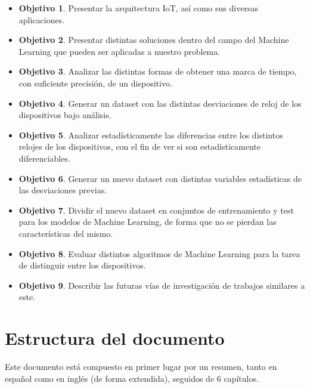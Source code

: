 \begin{itemize}
    \item \textbf{Objetivo 1}. Presentar la arquitectura IoT, así como sus diversas aplicaciones.
    \item \textbf{Objetivo 2}. Presentar distintas soluciones dentro del campo del Machine Learning que pueden ser aplicadas a nuestro problema.
    \item \textbf{Objetivo 3}. Analizar las distintas formas de obtener una marca de tiempo, con suficiente precisión, de un dispositivo.
    \item \textbf{Objetivo 4}. Generar un dataset con las distintas desviaciones de reloj de los dispositivos bajo análisis.
    \item \textbf{Objetivo 5}. Analizar estadísticamente las diferencias entre los distintos relojes de los dispositivos, con el fin de ver si son estadísticamente diferenciables.
    \item \textbf{Objetivo 6}. Generar un nuevo dataset con distintas variables estadísticas de las desviaciones previas.
    \item \textbf{Objetivo 7}. Dividir el nuevo dataset en conjuntos de entrenamiento y test para los modelos de Machine Learning, de forma que no se pierdan las características del mismo.
    \item \textbf{Objetivo 8}. Evaluar distintos algoritmos de Machine Learning para la tarea de distinguir entre los dispositivos.
    \item \textbf{Objetivo 9}. Describir las futuras vías de investigación de trabajos similares a este.
\end{itemize}

\section{Estructura del documento}

Este documento está compuesto en primer lugar por un resumen, tanto en español como en inglés (de forma extendida), seguidos de 6 capítulos.

